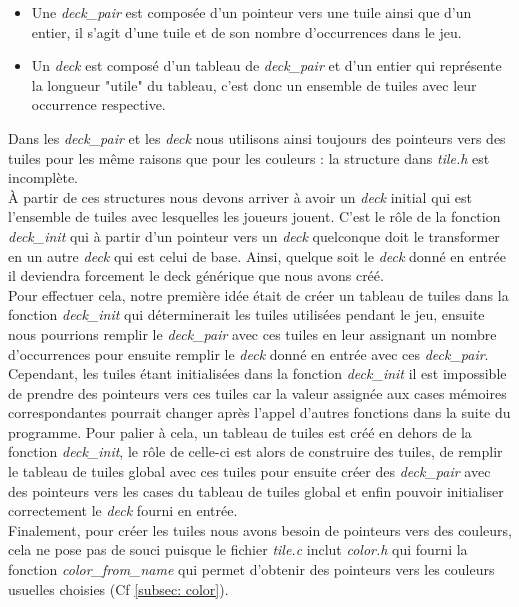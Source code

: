 \documentclass[11pt]{article}
\begin{document}
\begin{itemize}
\item Une \emph{deck\_pair} est composée d'un pointeur vers une tuile ainsi que d'un entier, il s'agit d'une tuile et de son nombre d'occurrences dans le jeu.
\item Un \emph{deck} est composé d'un tableau de \emph{deck\_pair} et d'un entier qui représente la longueur "utile" du tableau, c'est donc un ensemble de tuiles avec leur occurrence respective. \\
\end{itemize}
Dans les \emph{deck\_pair} et les \emph{deck} nous utilisons ainsi toujours des pointeurs vers des tuiles pour les même raisons que pour les couleurs : la structure dans \emph{tile.h} est incomplète. \\

\`A partir de ces structures nous devons arriver à avoir un \emph{deck} initial qui est l'ensemble de tuiles avec lesquelles les joueurs jouent. C'est le rôle de la fonction \emph{deck\_init} qui à partir d'un pointeur vers un \emph{deck} quelconque doit le transformer en un autre \emph{deck} qui est celui de base. Ainsi, quelque soit le \emph{deck} donné en entrée il deviendra forcement le deck générique que nous avons créé. \\

Pour effectuer cela, notre première idée était de créer un tableau de tuiles dans la fonction \emph{deck\_init} qui déterminerait les tuiles utilisées pendant le jeu, ensuite nous pourrions remplir le \emph{deck\_pair} avec ces tuiles en leur assignant un nombre d'occurrences pour ensuite remplir le \emph{deck} donné en entrée avec ces \emph{deck\_pair}. Cependant, les tuiles étant initialisées dans la fonction \emph{deck\_init} il est impossible de prendre des pointeurs vers ces tuiles car la valeur assignée aux cases mémoires correspondantes pourrait changer après l'appel d'autres fonctions dans la suite du programme. Pour palier à cela, un tableau de tuiles est créé en dehors de la fonction \emph{deck\_init}, le rôle de celle-ci est alors de construire des tuiles, de remplir le tableau de tuiles global avec ces tuiles pour ensuite créer des \emph{deck\_pair} avec des pointeurs vers les cases du tableau de tuiles global et enfin pouvoir initialiser correctement le \emph{deck} fourni en entrée. \\

Finalement, pour créer les tuiles nous avons besoin de pointeurs vers des couleurs, cela ne pose pas de souci puisque le fichier \emph{tile.c} inclut \emph{color.h} qui fourni la fonction \emph{color\_from\_name} qui permet d'obtenir des pointeurs vers les couleurs usuelles choisies (Cf \ref{subsec: color}). \\
\end{document}
